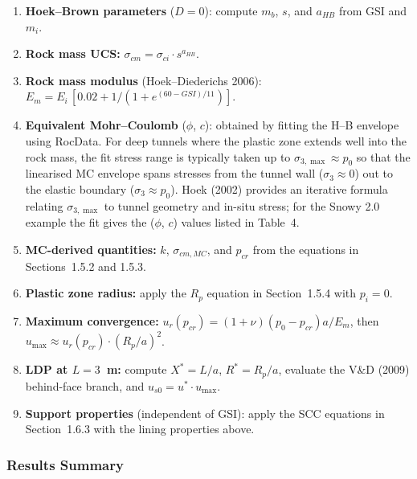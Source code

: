 \documentclass[a4paper,12pt]{article}
\begin{document}
\begin{enumerate}[leftmargin=*,itemsep=2pt]
    \item \textbf{Hoek--Brown parameters} ($D=0$): compute $m_b$, $s$, and $a_{HB}$ from GSI and $m_i$.
    \item \textbf{Rock mass UCS:} $\sigma_{cm} = \sigma_{ci} \cdot s^{a_{HB}}$.
    \item \textbf{Rock mass modulus} (Hoek--Diederichs 2006): $E_m = E_i \,[0.02 + 1/(1 + e^{(60-GSI)/11})]$.
    \item \textbf{Equivalent Mohr--Coulomb} ($\phi$, $c$): obtained by fitting the H--B envelope using RocData. For deep tunnels where the plastic zone extends well into the rock mass, the fit stress range is typically taken up to $\sigma_{3,\max} \approx p_0$ so that the linearised MC envelope spans stresses from the tunnel wall ($\sigma_3 \approx 0$) out to the elastic boundary ($\sigma_3 \approx p_0$). Hoek (2002) provides an iterative formula relating $\sigma_{3,\max}$ to tunnel geometry and in-situ stress; for the Snowy 2.0 example the fit gives the ($\phi$, $c$) values listed in Table~4.
    \item \textbf{MC-derived quantities:} $k$, $\sigma_{cm,MC}$, and $p_{cr}$ from the equations in Sections~1.5.2 and 1.5.3.
    \item \textbf{Plastic zone radius:} apply the $R_p$ equation in Section~1.5.4 with $p_i = 0$.
    \item \textbf{Maximum convergence:} $u_r(p_{cr}) = (1+\nu)(p_0-p_{cr})a/E_m$, then $u_{\max} \approx u_r(p_{cr}) \cdot (R_p/a)^2$.
    \item \textbf{LDP at $L = 3$~m:} compute $X^* = L/a$, $R^* = R_p/a$, evaluate the V\&D (2009) behind-face branch, and $u_{s0} = u^* \cdot u_{\max}$.
    \item \textbf{Support properties} (independent of GSI): apply the SCC equations in Section~1.6.3 with the lining properties above.
\end{enumerate}

\subsubsection{Results Summary}
\end{document}

